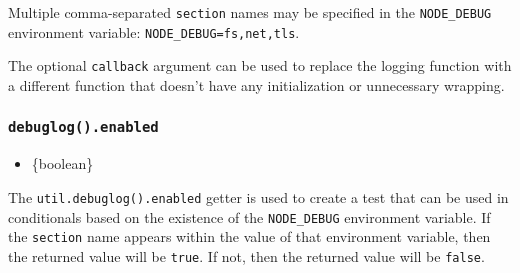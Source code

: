 \begin{Shaded}
\begin{Highlighting}[]
\end{Highlighting}
\end{Shaded}

Multiple comma-separated \texttt{section} names may be specified in the
\texttt{NODE\_DEBUG} environment variable:
\texttt{NODE\_DEBUG=fs,net,tls}.

The optional \texttt{callback} argument can be used to replace the
logging function with a different function that doesn't have any
initialization or unnecessary wrapping.

\begin{Shaded}
\begin{Highlighting}[]
\OperatorTok{=} \NormalTok{(}\NormalTok{)}\OperatorTok{;}
\OperatorTok{=}\NormalTok{(}\OperatorTok{,}\KeywordTok{=\textgreater{}}\NormalTok{ \{}
\OperatorTok{=}\OperatorTok{;}
\NormalTok{\})}\OperatorTok{;}
\end{Highlighting}
\end{Shaded}

\subsubsection{\texorpdfstring{\texttt{debuglog().enabled}}{debuglog().enabled}}\label{debuglog.enabled}

\begin{itemize}
\tightlist
\item
  \{boolean\}
\end{itemize}

The \texttt{util.debuglog().enabled} getter is used to create a test
that can be used in conditionals based on the existence of the
\texttt{NODE\_DEBUG} environment variable. If the \texttt{section} name
appears within the value of that environment variable, then the returned
value will be \texttt{true}. If not, then the returned value will be
\texttt{false}.

